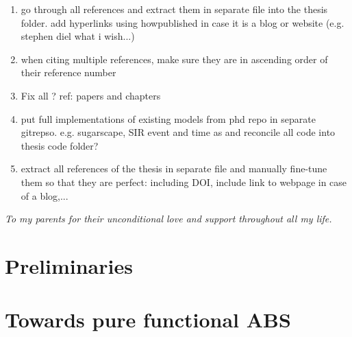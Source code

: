 \documentclass[oneside]{book}
\begin{document}
\begin{enumerate}
	\item go through all references and extract them in separate file into the thesis folder. add hyperlinks using howpublished in case it is a blog or website (e.g. stephen diel what i wish...)
	
	\item when citing multiple references, make sure they are in ascending order of their reference number
	\item Fix all ? ref: papers and chapters
		
	\item put full implementations of existing models from phd repo in separate gitrepso. e.g. sugarscape, SIR event and time as and reconcile all code into thesis code folder?
	
	\item extract all references of the thesis in separate file and manually fine-tune them so that they are perfect: including DOI, include link to webpage in case of a blog,...
\end{enumerate}


\clearpage
\tableofcontents
\clearpage
\textit{To my parents for their unconditional love and support throughout all my life.}
\clearpage



\epigraphhead[450]{}
\part{Preliminaries}







\epigraphhead[450]{}
\part{Towards pure functional ABS}

\end{document}
